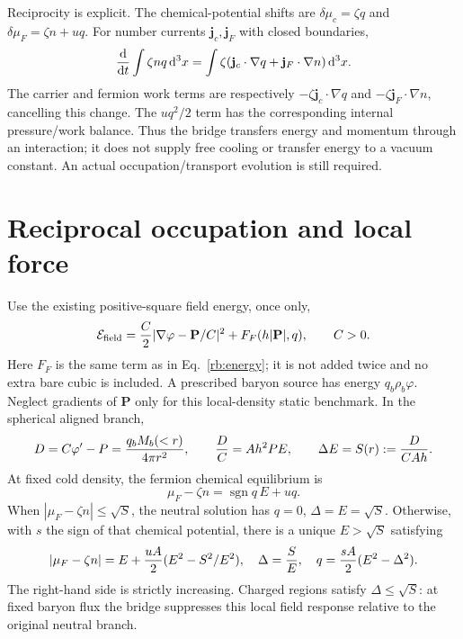 \documentclass[11pt]{article}
\newcommand{\dd}{\mathrm d}
\begin{document}
Reciprocity is explicit. The chemical-potential shifts are
$\delta\mu_c=\zeta q$ and $\delta\mu_F=\zeta n+u q$.
For number currents $\mathbf j_c,\mathbf j_F$ with closed boundaries,
\begin{equation}
 {\dd\over\dd t}\int\zeta nq\,\dd^3x
 =\int\zeta(\mathbf j_c\cdot\nabla q+
                       \mathbf j_F\cdot\nabla n)\,\dd^3x.
\end{equation}
The carrier and fermion work terms are respectively
$-\zeta\mathbf j_c\cdot\nabla q$ and
$-\zeta\mathbf j_F\cdot\nabla n$, cancelling this change.
The $u q^2/2$ term has the corresponding internal pressure/work balance.
Thus the bridge transfers energy and momentum through an interaction;
it does not supply free cooling or transfer energy to a vacuum constant.
An actual occupation/transport evolution is still required.

\section{Reciprocal occupation and local force}
Use the existing positive-square field energy, once only,
\begin{equation}
 \mathcal E_{\rm field}={C\over2}
       |\nabla\varphi-\mathbf P/C|^2
       +F_F(h|\mathbf P|,q),\qquad C>0.
\end{equation}
Here $F_F$ is the same term as in Eq.~\eqref{rb:energy}; it is not added
twice and no extra bare cubic is included. A prescribed baryon source
has energy $q_b\rho_b\varphi$. Neglect gradients of $\mathbf P$ only
for this local-density static benchmark. In the spherical aligned branch,
\begin{equation}
 D=C\varphi'-P={q_bM_b(<r)\over4\pi r^2},\qquad
 {D\over C}=A h^2P E,
 \qquad \Delta E=S(r):={D\over CAh}.
 \label{rb:field}
\end{equation}
At fixed cold density, the fermion chemical equilibrium is
\begin{equation}
 \mu_F-\zeta n=\operatorname{sgn}q\,E+u q.
\end{equation}
When $|\mu_F-\zeta n|\leq\sqrt S$, the neutral solution has
$q=0$, $\Delta=E=\sqrt S$. Otherwise, with $s$ the sign of that
chemical potential, there is a unique $E>\sqrt S$ satisfying
\begin{equation}
 |\mu_F-\zeta n|=E+{uA\over2}(E^2-S^2/E^2),\quad
 \Delta={S\over E},\quad q={sA\over2}(E^2-\Delta^2).
\end{equation}
The right-hand side is strictly increasing. Charged regions satisfy
$\Delta\leq\sqrt S$: at fixed baryon flux the bridge suppresses this
local field response relative to the original neutral branch.
\end{document}
